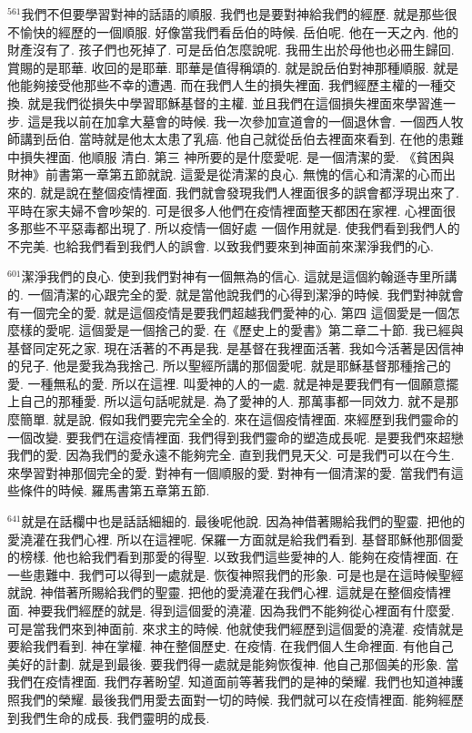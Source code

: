 \documentclass{book}
\begin{document}
$^{561}$我們不但要學習對神的話語的順服.
我們也是要對神給我們的經歷.
就是那些很不愉快的經歷的一個順服.
好像當我們看岳伯的時候.
岳伯呢.
他在一天之內.
他的財產沒有了.
孩子們也死掉了.
可是岳伯怎麼說呢.
我冊生出於母他也必冊生歸回.
賞賜的是耶華.
收回的是耶華.
耶華是值得稱頌的.
就是說岳伯對神那種順服.
就是他能夠接受他那些不幸的遭遇.
而在我們人生的損失裡面.
我們經歷主權的一種交換.
就是我們從損失中學習耶穌基督的主權.
並且我們在這個損失裡面來學習進一步.
這是我以前在加拿大墓會的時候.
我一次參加宣道會的一個退休會.
一個西人牧師講到岳伯.
當時就是他太太患了乳癌.
他自己就從岳伯去裡面來看到.
在他的患難中損失裡面.
他順服 清白.
第三 神所要的是什麼愛呢.
是一個清潔的愛.
《貧困與財神》前書第一章第五節就說.
這愛是從清潔的良心.
無愧的信心和清潔的心而出來的.
就是說在整個疫情裡面.
我們就會發現我們人裡面很多的誤會都浮現出來了.
平時在家夫婦不會吵架的.
可是很多人他們在疫情裡面整天都困在家裡.
心裡面很多那些不平惡毒都出現了.
所以疫情一個好處 一個作用就是.
使我們看到我們人的不完美.
也給我們看到我們人的誤會.
以致我們要來到神面前來潔淨我們的心.

$^{601}$潔淨我們的良心.
使到我們對神有一個無為的信心.
這就是這個約翰遜寺里所講的.
一個清潔的心跟完全的愛.
就是當他說我們的心得到潔淨的時候.
我們對神就會有一個完全的愛.
就是這個疫情是要我們超越我們愛神的心.
第四 這個愛是一個怎麼樣的愛呢.
這個愛是一個捨己的愛.
在《歷史上的愛書》第二章二十節.
我已經與基督同定死之家.
現在活著的不再是我.
是基督在我裡面活著.
我如今活著是因信神的兒子.
他是愛我為我捨己.
所以聖經所講的那個愛呢.
就是耶穌基督那種捨己的愛.
一種無私的愛.
所以在這裡.
叫愛神的人的一處.
就是神是要我們有一個願意擺上自己的那種愛.
所以這句話呢就是.
為了愛神的人.
那萬事都一同效力.
就不是那麼簡單.
就是說.
假如我們要完完全全的.
來在這個疫情裡面.
來經歷到我們靈命的一個改變.
要我們在這疫情裡面.
我們得到我們靈命的塑造成長呢.
是要我們來超戀我們的愛.
因為我們的愛永遠不能夠完全.
直到我們見天父.
可是我們可以在今生.
來學習對神那個完全的愛.
對神有一個順服的愛.
對神有一個清潔的愛.
當我們有這些條件的時候.
羅馬書第五章第五節.

$^{641}$就是在話欄中也是話話細細的.
最後呢他說.
因為神借著賜給我們的聖靈.
把他的愛澆灌在我們心裡.
所以在這裡呢.
保羅一方面就是給我們看到.
基督耶穌他那個愛的榜樣.
他也給我們看到那愛的得聖.
以致我們這些愛神的人.
能夠在疫情裡面.
在一些患難中.
我們可以得到一處就是.
恢復神照我們的形象.
可是也是在這時候聖經就說.
神借著所賜給我們的聖靈.
把他的愛澆灌在我們心裡.
這就是在整個疫情裡面.
神要我們經歷的就是.
得到這個愛的澆灌.
因為我們不能夠從心裡面有什麼愛.
可是當我們來到神面前.
來求主的時候.
他就使我們經歷到這個愛的澆灌.
疫情就是要給我們看到.
神在掌權.
神在整個歷史.
在疫情.
在我們個人生命裡面.
有他自己美好的計劃.
就是到最後.
要我們得一處就是能夠恢復神.
他自己那個美的形象.
當我們在疫情裡面.
我們存著盼望.
知道面前等著我們的是神的榮耀.
我們也知道神護照我們的榮耀.
最後我們用愛去面對一切的時候.
我們就可以在疫情裡面.
能夠經歷到我們生命的成長.
我們靈明的成長.
\end{document}
